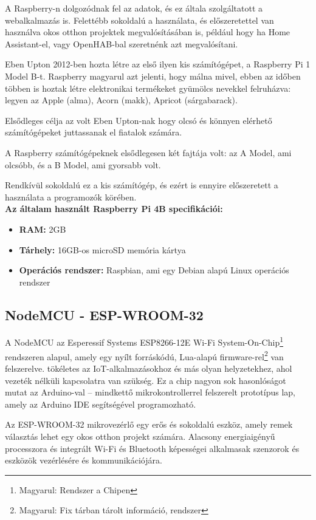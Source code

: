 \documentclass[
]{thesis-ekf}
\theoremstyle{definition}
\theoremstyle{remark}
\begin{document}
	A Raspberry-n dolgozódnak fel az adatok, és ez általa szolgáltatott a webalkalmazás is. Felettébb sokoldalú a használata, és előszeretettel van használva okos otthon projektek megvalósításában is, például hogy ha Home Assistant-el, vagy OpenHAB-bal szeretnénk azt megvalósítani.
	
	Eben Upton 2012-ben hozta létre az első ilyen kis számítógépet, a Raspberry Pi 1 Model B-t. Raspberry magyarul azt jelenti, hogy málna mivel, ebben az időben többen is hoztak létre elektronikai termékeket gyümölcs nevekkel felruházva: legyen az Apple (alma), Acorn (makk), Apricot (sárgabarack).
	
	Elsődleges célja az volt Eben Upton-nak hogy olcsó és könnyen elérhető számítógépeket juttassanak el fiatalok számára.
	
	A Raspberry számítógépeknek elsődlegesen két fajtája volt: az A Model, ami olcsóbb, és a B Model, ami gyorsabb volt.\cite{raspberrypi-history}
	
	Rendkívül sokoldalú ez a kis számítógép, és ezért is ennyire előszeretett a használata a programozók körében.\\
	\textbf{Az általam használt Raspberry Pi 4B specifikációi:}
	\begin{itemize}
		\item \textbf{RAM:} 2GB
		\item \textbf{Tárhely:} 16GB-os microSD memória kártya
		\item \textbf{Operációs rendszer:} Raspbian, ami egy Debian alapú Linux operációs rendszer
	\end{itemize}
	
	\subsection{NodeMCU - ESP-WROOM-32}\label{nodemcu-sec}
	
	A NodeMCU az Esperessif Systems ESP8266-12E Wi-Fi System-On-Chip\footnote{Magyarul: Rendszer a Chipen} rendszeren alapul, amely egy nyílt forráskódú, Lua-alapú firmware-rel\footnote{Magyarul: Fix tárban tárolt információ, rendszer} van felszerelve. tökéletes az IoT-alkalmazásokhoz és más olyan helyzetekhez, ahol vezeték nélküli kapcsolatra van szükség. Ez a chip nagyon sok hasonlóságot mutat az Arduino-val – mindkettő mikrokontrollerrel felszerelt prototípus lap, amely az Arduino IDE segítségével programozható.\cite{esp-8266}
	
	Az ESP-WROOM-32 mikrovezérlő egy erős és sokoldalú eszköz, amely remek választás lehet egy okos otthon projekt számára. Alacsony energiaigényű processzora és integrált Wi-Fi és Bluetooth képességei alkalmasak szenzorok és eszközök vezérlésére és kommunikációjára.
	
\end{document}
